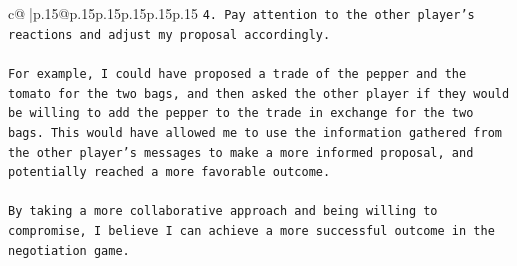 \documentclass{article}
\begin{document}
{\begin{supertabular}{c@{$\;$}|p{.15\linewidth}@{}p{.15\linewidth}p{.15\linewidth}p{.15\linewidth}p{.15\linewidth}p{.15\linewidth}}
{{{\texttt{4. Pay attention to the other player's reactions and adjust my proposal accordingly.} \\
\\ 
\texttt{For example, I could have proposed a trade of the pepper and the tomato for the two bags, and then asked the other player if they would be willing to add the pepper to the trade in exchange for the two bags. This would have allowed me to use the information gathered from the other player's messages to make a more informed proposal, and potentially reached a more favorable outcome.} \\
\\ 
\texttt{By taking a more collaborative approach and being willing to compromise, I believe I can achieve a more successful outcome in the negotiation game.} \\
            }
        }
    }
     \\ \\

\end{supertabular}
}
\end{document}
